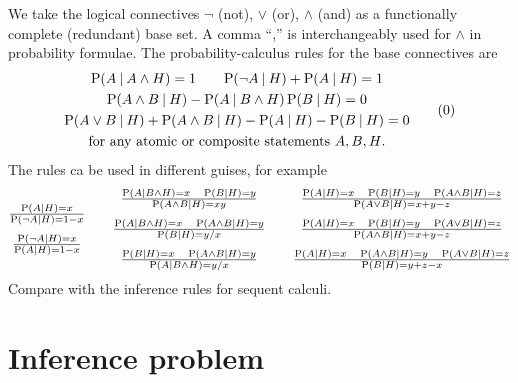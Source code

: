 \documentclass[\ifafour a4paper,12pt,\else a5paper,10pt,\fi%
onecolumn,oneside,article,%
british%
]{memoir}
\theoremstyle{remark}
\theoremstyle{innote}
\renewcommand*{\P}{\mathrm{P}}%
\renewcommand*{\|}[1][]{\nonscript\:#1\vert\nonscript\:\mathopen{}}
\newcommand*{\chap}{ch.}%
\newcommand*{\eg}{{e.g.}}
\begin{document}
We take the logical connectives $\lnot$ (not), $\lor$ (or), $\land$ (and) as a functionally complete (redundant) base set. A comma \enquote{,} is interchangeably used for $\land$ in probability formulae. The probability-calculus rules for the base connectives are
\begin{equation}
  \begin{gathered}
\P(A\|A \land H) = 1
\qquad
\P(\lnot A\|H) + \P(A \|H) = 1
\\
\P(A\land B \|H) - \P(A\|B\land H) \, \P(B\| H)= 0
  \\
  \P(A\lor B \|H) + \P(A\land B \|H) -\P(A\|H)-  \P(B\| H)=0
  \\
  \text{for any atomic or composite statements $A,B,H$.}
\end{gathered}
\tag{0}\label{eq:Prules}
\end{equation}
The rules ca be used in different guises, for example
\begin{equation*}
  \begin{gathered}
    \textstyle
    \frac{\P(A\|H) = x}{\P(\lnot A \|H) = 1-x}
  \\[\jot]
    \textstyle
  \frac{\P(\lnot A\|H) = x}{\P(A \|H) = 1-x}
\end{gathered}\qquad
  \begin{gathered}
  \textstyle
  \frac{\P(A\|B\land H) = x \quad \P(B\| H)=y}{\P(A\land B \|H) = x y}
  \\[\jot]
  \textstyle
 \frac{\P(A\|B\land H) = x \quad \P(A\land B \|H)=y}{\P(B\| H)=y/x}
\\[\jot]
  \textstyle
 \frac{\P(B\| H) = x \quad \P(A\land B \|H)=y}{\P(A\| B\land H)=y/x}
\end{gathered}\qquad
  \begin{gathered}
\textstyle
  \frac{\P(A\|H) = x \quad \P(B\| H)=y \quad
  \P(A\land B \|H)=z}{\P(A\lor B \|H) = x+y-z}
\\[\jot]
\textstyle
  \frac{\P(A\|H) = x \quad \P(B\| H)=y \quad
  \P(A\lor B \|H)=z}{\P(A\land B \|H) = x+y-z}
\\[\jot]
\textstyle
  \frac{\P(A\|H) = x \quad \P(A\land B \|H) = y\quad 
  \P(A\lor B \|H)=z }{\P(B\| H)=y+z-x}
\end{gathered}
\end{equation*}
Compare with the inference rules for sequent calculi.\autocites[\eg][\chap~1]{huthetal2000_r2004}[App.~A]{prawitz1965}[see also][]{boricic2020}

\section{Inference problem}
\label{sec:inference}
\end{document}
